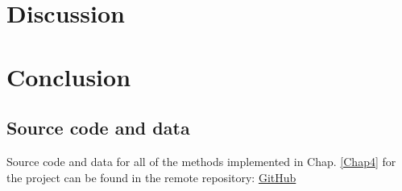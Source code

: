 \documentclass[12pt, a4paper]{report}
\begin{document}
\chapter{Discussion} \label{Chap6}
\chapter{Conclusion} \label{Chap7}


\renewcommand{\bibname}{References}

%

\begin{appendices}
\chapter{Source code and data} \label{System Requirements}
Source code and data for all of the methods implemented in Chap. \ref{Chap4} for the project can be found in the remote repository: \href{https://github.com/rpoandres/MSc_USS_Dissertation}{GitHub}






\end{appendices}
\clearpage
\printglossaries

\end{document}
